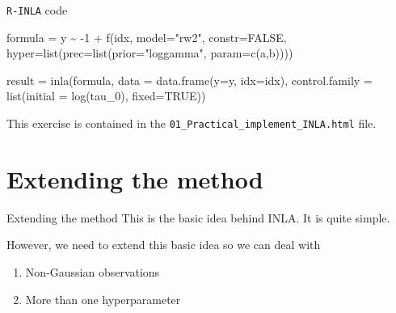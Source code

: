 \documentclass[
  ignorenonframetext,
]{beamer}
\newenvironment{Shaded}{\begin{snugshade}}{\end{snugshade}}
\newcommand{\AttributeTok}[1]{\textcolor[rgb]{0.77,0.63,0.00}{#1}}
\newcommand{\ConstantTok}[1]{\textcolor[rgb]{0.00,0.00,0.00}{#1}}
\newcommand{\DecValTok}[1]{\textcolor[rgb]{0.00,0.00,0.81}{#1}}
\newcommand{\FunctionTok}[1]{\textcolor[rgb]{0.00,0.00,0.00}{#1}}
\newcommand{\NormalTok}[1]{#1}
\newcommand{\OtherTok}[1]{\textcolor[rgb]{0.56,0.35,0.01}{#1}}
\newcommand{\SpecialCharTok}[1]{\textcolor[rgb]{0.00,0.00,0.00}{#1}}
\newcommand{\StringTok}[1]{\textcolor[rgb]{0.31,0.60,0.02}{#1}}
\begin{document}
\begin{frame}[fragile]{\texttt{R-INLA} code}
\protect\hypertarget{r-inla-code}{}
\small

\begin{Shaded}
\begin{Highlighting}[]
\NormalTok{formula }\OtherTok{=}\NormalTok{ y }\SpecialCharTok{\textasciitilde{}} \SpecialCharTok{{-}}\DecValTok{1} \SpecialCharTok{+} \FunctionTok{f}\NormalTok{(idx, }\AttributeTok{model=}\StringTok{"rw2"}\NormalTok{, }\AttributeTok{constr=}\ConstantTok{FALSE}\NormalTok{,}
   \AttributeTok{hyper=}\FunctionTok{list}\NormalTok{(}\AttributeTok{prec=}\FunctionTok{list}\NormalTok{(}\AttributeTok{prior=}\StringTok{"loggamma"}\NormalTok{, }\AttributeTok{param=}\FunctionTok{c}\NormalTok{(a,b))))}

\NormalTok{result }\OtherTok{=} \FunctionTok{inla}\NormalTok{(formula,}
      \AttributeTok{data =} \FunctionTok{data.frame}\NormalTok{(}\AttributeTok{y=}\NormalTok{y, }\AttributeTok{idx=}\NormalTok{idx),}
      \AttributeTok{control.family =} \FunctionTok{list}\NormalTok{(}\AttributeTok{initial =} \FunctionTok{log}\NormalTok{(tau\_0), }\AttributeTok{fixed=}\ConstantTok{TRUE}\NormalTok{))}
\end{Highlighting}
\end{Shaded}

\normalsize

This exercise is contained in the
\texttt{01\_Practical\_implement\_INLA.html} file.
\end{frame}

\hypertarget{extending-the-method}{%
\section{Extending the method}\label{extending-the-method}}

\begin{frame}{Extending the method}
\protect\hypertarget{extending-the-method-1}{}
This is the basic idea behind INLA. It is quite simple.

However, we need to extend this basic idea so we can deal with

\begin{enumerate}
\item
  Non-Gaussian observations
\item
  More than one hyperparameter
\end{enumerate}
\end{frame}
\end{document}
